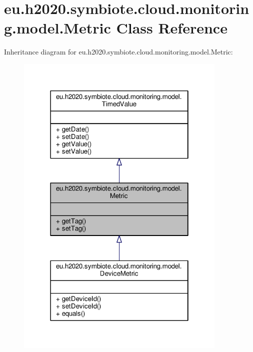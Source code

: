 \hypertarget{classeu_1_1h2020_1_1symbiote_1_1cloud_1_1monitoring_1_1model_1_1Metric}{}\section{eu.\+h2020.\+symbiote.\+cloud.\+monitoring.\+model.\+Metric Class Reference}
\label{classeu_1_1h2020_1_1symbiote_1_1cloud_1_1monitoring_1_1model_1_1Metric}


Inheritance diagram for eu.\+h2020.\+symbiote.\+cloud.\+monitoring.\+model.\+Metric\+:
\nopagebreak
\begin{figure}[H]
\begin{center}
\leavevmode
\includegraphics[width=286pt]{classeu_1_1h2020_1_1symbiote_1_1cloud_1_1monitoring_1_1model_1_1Metric__inherit__graph}
\end{center}
\end{figure}


